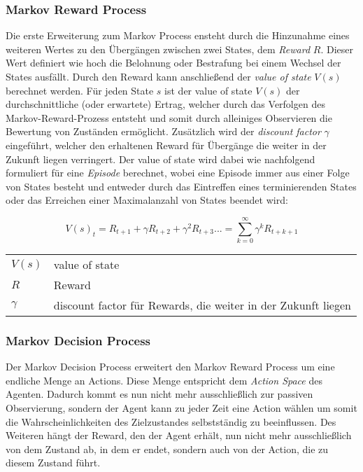 \documentclass[11pt]{scrartcl}
\makeatletter
\newenvironment{conditions}
  {\par\vspace{\abovedisplayskip}\noindent\begin{tabular}{>{$}l<{$} @{${}:{}$} l}}
  {\end{tabular}\par\vspace{\belowdisplayskip}}
\makeatother
\begin{document}
\subsubsection{Markov Reward Process}
\label{sec:markov_reward_process}
Die erste Erweiterung zum Markov Process ensteht durch die Hinzunahme eines weiteren Wertes zu den 
Übergängen zwischen zwei States, dem \textit{Reward} $R$. Dieser Wert definiert wie hoch die Belohnung
oder Bestrafung bei einem Wechsel der States ausfällt. Durch den Reward kann anschließend der
\textit{value of state} $V(s)$ berechnet werden. Für jeden State $s$ ist der value of state $V(s)$
der durchschnittliche (oder erwartete) Ertrag, welcher durch das Verfolgen des Markov-Reward-Prozess
entsteht und somit durch alleiniges Observieren die Bewertung von Zuständen ermöglicht.
Zusätzlich wird der \textit{discount factor} $\gamma$ eingeführt, welcher den erhaltenen Reward
für Übergänge die weiter in der Zukunft liegen verringert. Der value of state wird dabei wie
nachfolgend formuliert für eine \textit{Episode} berechnet, wobei eine Episode immer aus einer
Folge von States besteht und entweder durch das Eintreffen eines terminierenden States oder das
Erreichen einer Maximalanzahl von States beendet wird:

\begin{equation}
V(s)_t = R_{t+1} + \gamma R_{t+2} + \gamma^2 R_{t+3} ... = \sum_{k=0}^\infty \gamma^{k} R_{t+k+1}
\label{eq:value-of-state}
\end{equation} 

\begin{conditions}
 V(s)     	&  value of state \\
 R	     	&  Reward \\   
 \gamma 	&  discount factor für Rewards, die weiter in der Zukunft liegen
\end{conditions}

\subsubsection{Markov Decision Process}
Der Markov Decision Process erweitert den Markov Reward Process um eine endliche Menge an Actions.
Diese Menge entspricht dem \textit{Action Space} des Agenten. Dadurch kommt es nun nicht mehr
ausschließlich zur passiven Observierung, sondern der Agent kann zu jeder Zeit eine Action wählen um
somit die Wahrscheinlichkeiten des Zielzustandes selbstständig zu beeinflussen. Des Weiteren hängt 
der Reward, den der Agent erhält, nun nicht mehr ausschließlich von dem Zustand ab, in dem er endet,
sondern auch von der Action, die zu diesem Zustand führt. 
\end{document}

